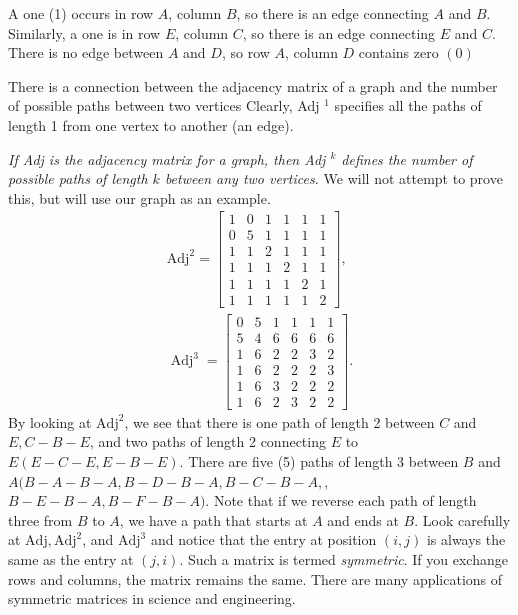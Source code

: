 \documentclass[../main.tex]{subfiles}
\begin{document}
A one (1) occurs in row $A$, column $B$, so there is an edge connecting $A$ and $B$. Similarly, a one is in row $E$, column $C$, so there is an edge connecting $E$ and $C .$ There is no edge between $A$ and $D$, so row $A$, column $D$ contains zero $(0)$

There is a connection between the adjacency matrix of a graph and the number of possible paths between two vertices Clearly, Adj $^{1}$ specifies all the paths of length 1 from one vertex to another (an edge).

\emph{If Adj is the adjacency matrix for a graph, then Adj $^{k}$ defines the number of possible paths of length $k$ between any two vertices.} We will not attempt to prove this, but will use our graph as an example.
$$
\begin{array}{l}
\mathrm{Adj}^{2}=\left[\begin{array}{llllll}
1 & 0 & 1 & 1 & 1 & 1 \\
0 & 5 & 1 & 1 & 1 & 1 \\
1 & 1 & 2 & 1 & 1 & 1 \\
1 & 1 & 1 & 2 & 1 & 1 \\
1 & 1 & 1 & 1 & 2 & 1 \\
1 & 1 & 1 & 1 & 1 & 2
\end{array}\right], \\
\operatorname{Adj}^{3}=\left[\begin{array}{llllll}
0 & 5 & 1 & 1 & 1 & 1 \\
5 & 4 & 6 & 6 & 6 & 6 \\
1 & 6 & 2 & 2 & 3 & 2 \\
1 & 6 & 2 & 2 & 2 & 3 \\
1 & 6 & 3 & 2 & 2 & 2 \\
1 & 6 & 2 & 3 & 2 & 2
\end{array}\right] .
\end{array}
$$
By looking at $\mathrm{Adj}^{2}$, we see that there is one path of length 2 between $C$ and $E, C-B-E$, and two paths of length 2 connecting $E$ to $E(E-C-E, E-B-E) .$ There are five (5) paths of length 3 between $B$ and $A(B-A-B-A, B-D-B-A, B-C-B-A,$, $B-E-B-A, B-F-B-A) .$ Note that if we reverse each path of length three from $B$ to $A$, we have a path that starts at $A$ and ends at $B$. Look carefully at $\mathrm{Adj}, \mathrm{Adj}^{2}$, and $\mathrm{Adj}^{3}$ and notice that the entry at position $(i, j)$ is always the same as the entry at $(j, i) .$ Such a matrix is termed \emph{symmetric}. If you exchange rows and columns, the matrix remains the same. There are many applications of symmetric matrices in science and engineering.
\end{document}
